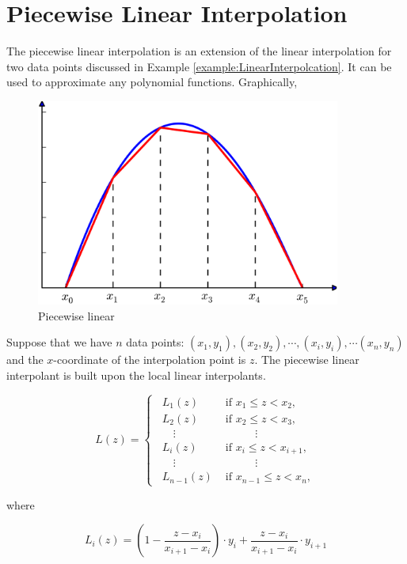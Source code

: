 \section{Piecewise Linear Interpolation}
\label{example:PiecewiseLinearInterpolcation}

The piecewise linear interpolation is an extension of the linear interpolation for two data points discussed in Example \ref{example:LinearInterpolcation}. It can be used to approximate any polynomial functions. Graphically,

\begin{figure}[h]
\centering
\includegraphics[width=10cm]{./figures/PiecewiseLinear.pdf}
\caption{Piecewise linear}
\label{fig:PiecewiseLinear}
\end{figure}

Suppose that we have $n$ data points: $(x_1, y_1), (x_2, y_2), \cdots, (x_i, y_i), \cdots (x_n, y_n)$ and the $x$-coordinate of the interpolation point is $z$. The piecewise linear interpolant is built upon the local linear interpolants.

$$
L(z) = 
\begin{cases}
\enspace L_1(z) & \text{ if } x_1 \le z < x_2, \\
\enspace L_2(z) & \text{ if } x_2 \le z < x_3, \\
\enspace \quad\vdots & \qquad\quad\vdots \\
\enspace L_i(z) & \text{ if } x_i \le z < x_{i+1}, \\
\enspace \quad\vdots & \qquad\quad\vdots \\
\enspace L_{n-1}(z) & \text{ if } x_{n-1} \le z < x_n,
\end{cases}
$$

where

$$
L_i(z) = \left(1-\frac{z-x_i}{x_{i+1}-x_i}\right) \cdot y_i + \frac{z-x_i}{x_{i+1}-x_i} \cdot y_{i+1}
$$

